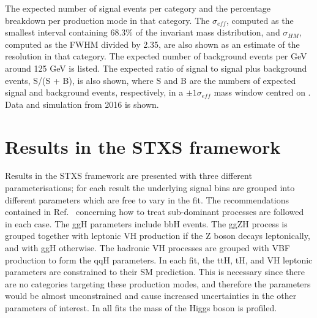 \begin{landscape}
  \begin{table}
    \resizebox{1.5\textwidth}{!}{}
    \caption{
      The expected number of signal events per category and
      the percentage breakdown per production mode in that category. 
      The $\sigma_{eff}$, computed as the smallest interval containing 68.3\% 
      of the invariant mass distribution, and $\sigma_{HM}$, computed as the FWHM divided by 2.35,
      are also shown as an estimate of the \mgg resolution in that category.
      The expected number of background events per GeV around 125 GeV is listed.
      The expected ratio of signal to signal plus background events, S/(S + B), is also shown,
      where S and B are the numbers of expected signal and background events, respectively, 
      in a $\pm 1 \sigma_{eff}$ mass window centred on \mH.
      Data and simulation from 2016 is shown.}
    \label{tab:results_yields2017}
  \end{table}
\end{landscape}

\section{Results in the STXS framework}

Results in the STXS framework are presented with three different parameterisations;
for each result the underlying signal bins 
are grouped into different parameters which are free to vary in the fit.
The recommendations contained in Ref.~\cite{YR4} 
concerning how to treat sub-dominant processes are followed in each case.
The ggH parameters include bbH events.
The ggZH process is grouped together with leptonic VH production if the Z boson decays leptonically, 
and with ggH otherwise.
The hadronic VH processes are grouped with VBF production to form the qqH parameters.
In each fit, the ttH, tH, and VH leptonic parameters are constrained to their SM prediction. 
This is necessary since there are no categories targeting these production modes, 
and therefore the parameters would be almost unconstrained 
and cause increased uncertainties in the other parameters of interest.
In all fits the mass of the Higgs boson is profiled.

